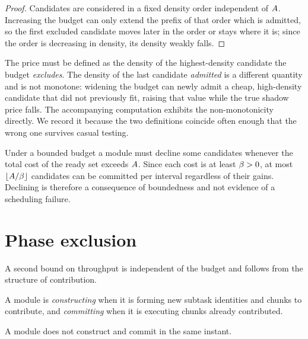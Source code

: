 \begin{proof}
Candidates are considered in a fixed density order independent of $A$.
Increasing the budget can only extend the prefix of that order which is
admitted, so the first excluded candidate moves later in the order or stays
where it is; since the order is decreasing in density, its density weakly
falls.
\end{proof}

\begin{remark}
\label{rem:price-definition}
The price must be defined as the density of the highest-density candidate
the budget \emph{excludes}. The density of the last candidate \emph{admitted}
is a different quantity and is not monotone: widening the budget can newly
admit a cheap, high-density candidate that did not previously fit, raising
that value while the true shadow price falls. The accompanying computation
exhibits the non-monotonicity directly. We record it because the two
definitions coincide often enough that the wrong one survives casual testing.
\end{remark}

\begin{corollary}
\label{cor:declining}
Under a bounded budget a module must decline some candidates whenever the
total cost of the ready set exceeds $A$. Since each cost is at least
$\beta>0$, at most $\lfloor A/\beta\rfloor$ candidates can be committed per
interval regardless of their gains. Declining is therefore a consequence of
boundedness and not evidence of a scheduling failure.
\end{corollary}

\section{Phase exclusion}
\label{sec:phase}

A second bound on throughput is independent of the budget and follows from
the structure of contribution.

\begin{definition}
\label{def:phases}
A module is \emph{constructing} when it is forming new subtask identities and
chunks to contribute, and \emph{committing} when it is executing chunks
already contributed.
\end{definition}

\begin{axiom}
\label{ax:phase}
A module does not construct and commit in the same instant.
\end{axiom}


